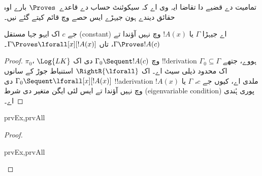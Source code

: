 \documentclass[../../../include/open-logic-section]{subfiles}
\begin{document}

\begin{explain}
  تمامیت دے قضیے دا تقاضا ایہ وی اے کہ سیکوئنٹ حساب دے قاعدے~$\Proves$
  بارے اوہ حقائق دیندے ہون جیہڑے ایس حصے وچ قائم کیتے گئے نیں۔
\end{explain}

\begin{thm}
 جے $c$ اک ایہو جہا مستقل (constant) اے جیہڑا
$\Gamma$ یا $!A(x)$ وچ نہیں آؤندا تے $\Gamma \Proves !A(c)$، تاں $\Gamma
\Proves \lforall[x][!A(x)]$۔
\end{thm}

\begin{proof}
$\pi_0$، $\Log{LK}$ وچ $\Gamma_0 \Sequent !A(c)$ دی اک !!{derivation} ہووے، جتھے
$\Gamma_0 \subseteq \Gamma$ اک محدود ذیلی سیٹ اے۔ اک $\RightR{\lforall}$ استنباط جوڑ کے سانوں
$\Gamma_0 \Sequent \lforall[x][!A(x)]$ دی !!a{derivation} ملدی اے، کیوں جے $c$،
$\Gamma$ یا $!A(x)$ وچ نہیں آؤندا تے ایس لئی ایگن متغیر دی شرط
(eigenvariable condition) پوری ہُندی اے۔
\end{proof}

\begin{prop}
\begin{tagenumerate}{prvEx,prvAll}
\end{tagenumerate}
\end{prop}

\begin{proof}
\begin{tagenumerate}{prvEx,prvAll}
\end{tagenumerate}
\end{proof}
\end{document}
